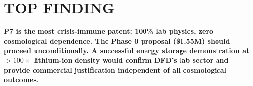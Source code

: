 \documentclass[11pt]{article}
\begin{document}
\section*{TOP FINDING}

\begin{tcolorbox}[colback=blue!5!white, colframe=blue!70!black]
\textbf{P7 is the most crisis-immune patent: 100\% lab physics, zero
cosmological dependence. The Phase 0 proposal (\$1.55M) should proceed
unconditionally. A successful energy storage demonstration at $>100\times$
lithium-ion density would confirm DFD's lab sector and provide
commercial justification independent of all cosmological outcomes.}
\end{tcolorbox}
\end{document}
